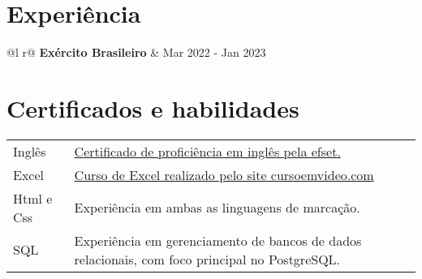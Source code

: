 \documentclass[a4paper,12pt]{article}
\begin{document}
\section{Experiência}
\begin{tabularx}{\linewidth}{ @{}l r@{} }
\textbf{Exército Brasileiro} & \hfill Mar 2022 - Jan 2023 \\[3.75pt]
\end{tabularx}



\section{Certificados e habilidades}
\begin{tabularx}{\linewidth}{@{}l X@{}}
Inglês &  \normalsize{\href{https://cert.efset.org/KdGLiQ}{Certificado de proficiência em inglês pela efset.}}\\
Excel & \normalsize{\href{https://www.cursoemvideo.com/certificates/certificado/?course_id=25933&cert-nonce=03d3237805}{Curso de Excel realizado pelo site cursoemvideo.com}}\\  
Html e Css  & \normalsize{Experiência em ambas as linguagens de marcação.} \\ 
SQL & \normalsize{Experiência em gerenciamento de bancos de dados relacionais, com foco principal no PostgreSQL.} \\
\end{tabularx}
\vfill
\end{document}
